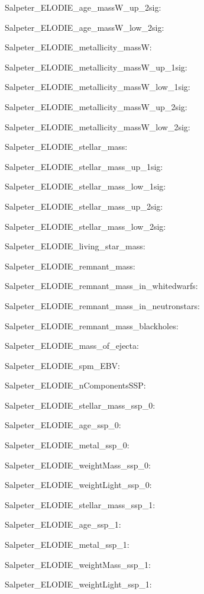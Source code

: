 \item Salpeter\_ELODIE\_age\_massW\_up\_2sig: 
\item Salpeter\_ELODIE\_age\_massW\_low\_2sig: 
\item Salpeter\_ELODIE\_metallicity\_massW: 
\item Salpeter\_ELODIE\_metallicity\_massW\_up\_1sig: 
\item Salpeter\_ELODIE\_metallicity\_massW\_low\_1sig: 
\item Salpeter\_ELODIE\_metallicity\_massW\_up\_2sig: 
\item Salpeter\_ELODIE\_metallicity\_massW\_low\_2sig: 
\item Salpeter\_ELODIE\_stellar\_mass: 
\item Salpeter\_ELODIE\_stellar\_mass\_up\_1sig: 
\item Salpeter\_ELODIE\_stellar\_mass\_low\_1sig: 
\item Salpeter\_ELODIE\_stellar\_mass\_up\_2sig: 
\item Salpeter\_ELODIE\_stellar\_mass\_low\_2sig: 
\item Salpeter\_ELODIE\_living\_star\_mass: 
\item Salpeter\_ELODIE\_remnant\_mass: 
\item Salpeter\_ELODIE\_remnant\_mass\_in\_whitedwarfs: 
\item Salpeter\_ELODIE\_remnant\_mass\_in\_neutronstars: 
\item Salpeter\_ELODIE\_remnant\_mass\_blackholes: 
\item Salpeter\_ELODIE\_mass\_of\_ejecta: 
\item Salpeter\_ELODIE\_spm\_EBV: 
\item Salpeter\_ELODIE\_nComponentsSSP: 
\item Salpeter\_ELODIE\_stellar\_mass\_ssp\_0: 
\item Salpeter\_ELODIE\_age\_ssp\_0: 
\item Salpeter\_ELODIE\_metal\_ssp\_0: 
\item Salpeter\_ELODIE\_weightMass\_ssp\_0: 
\item Salpeter\_ELODIE\_weightLight\_ssp\_0: 
\item Salpeter\_ELODIE\_stellar\_mass\_ssp\_1: 
\item Salpeter\_ELODIE\_age\_ssp\_1: 
\item Salpeter\_ELODIE\_metal\_ssp\_1: 
\item Salpeter\_ELODIE\_weightMass\_ssp\_1: 
\item Salpeter\_ELODIE\_weightLight\_ssp\_1: 
